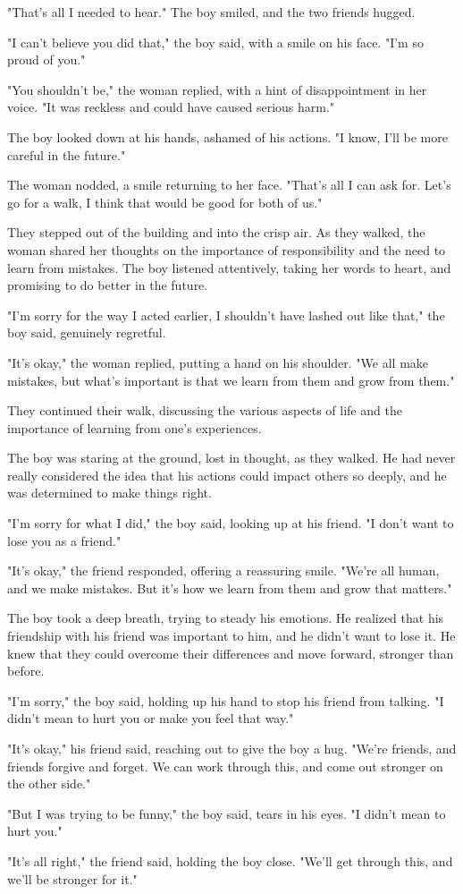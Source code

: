 \documentclass[smalldemyvopaper,11pt,twoside,onecolumn,openright,extrafontsizes]{memoir}
\begin{document}
"That's all I needed to hear." The boy smiled, and the two friends hugged.\par
"I can't believe you did that," the boy said, with a smile on his face. "I'm so proud of you."\par
"You shouldn't be," the woman replied, with a hint of disappointment in her voice. "It was reckless and could have caused serious harm."\par
The boy looked down at his hands, ashamed of his actions. "I know, I'll be more careful in the future."\par
The woman nodded, a smile returning to her face. "That's all I can ask for. Let's go for a walk, I think that would be good for both of us."\par
They stepped out of the building and into the crisp air. As they walked, the woman shared her thoughts on the importance of responsibility and the need to learn from mistakes. The boy listened attentively, taking her words to heart, and promising to do better in the future.\par
"I'm sorry for the way I acted earlier, I shouldn't have lashed out like that," the boy said, genuinely regretful.\par
"It's okay," the woman replied, putting a hand on his shoulder. "We all make mistakes, but what's important is that we learn from them and grow from them."\par
They continued their walk, discussing the various aspects of life and the importance of learning from one's experiences.\par
The boy was staring at the ground, lost in thought, as they walked. He had never really considered the idea that his actions could impact others so deeply, and he was determined to make things right.\par
"I'm sorry for what I did," the boy said, looking up at his friend. "I don't want to lose you as a friend."\par
"It's okay," the friend responded, offering a reassuring smile. "We're all human, and we make mistakes. But it's how we learn from them and grow that matters."\par
The boy took a deep breath, trying to steady his emotions. He realized that his friendship with his friend was important to him, and he didn't want to lose it. He knew that they could overcome their differences and move forward, stronger than before.\par
"I'm sorry," the boy said, holding up his hand to stop his friend from talking. "I didn't mean to hurt you or make you feel that way."\par
"It's okay," his friend said, reaching out to give the boy a hug. "We're friends, and friends forgive and forget. We can work through this, and come out stronger on the other side."\par
"But I was trying to be funny," the boy said, tears in his eyes. "I didn't mean to hurt you."\par
"It's all right," the friend said, holding the boy close. "We'll get through this, and we'll be stronger for it."\par
\end{document}

